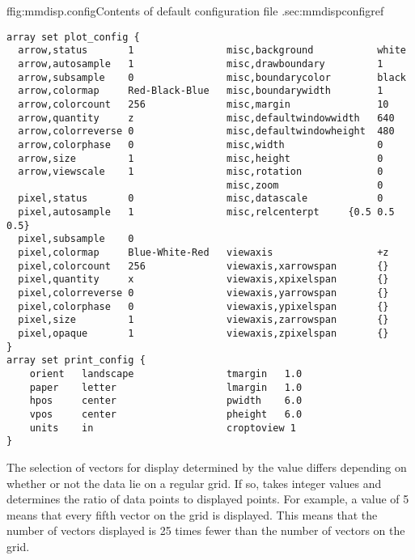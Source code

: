 \begin{codelisting}{f}{fig:mmdisp.config}{Contents of default configuration
  file .}{sec:mmdispconfig}{ref}
\begin{verbatim}
array set plot_config {
  arrow,status       1                misc,background           white
  arrow,autosample   1                misc,drawboundary         1
  arrow,subsample    0                misc,boundarycolor        black
  arrow,colormap     Red-Black-Blue   misc,boundarywidth        1
  arrow,colorcount   256              misc,margin               10
  arrow,quantity     z                misc,defaultwindowwidth   640
  arrow,colorreverse 0                misc,defaultwindowheight  480
  arrow,colorphase   0                misc,width                0
  arrow,size         1                misc,height               0
  arrow,viewscale    1                misc,rotation             0
                                      misc,zoom                 0
  pixel,status       0                misc,datascale            0
  pixel,autosample   1                misc,relcenterpt     {0.5 0.5 0.5}
  pixel,subsample    0
  pixel,colormap     Blue-White-Red   viewaxis                  +z
  pixel,colorcount   256              viewaxis,xarrowspan       {}
  pixel,quantity     x                viewaxis,xpixelspan       {}
  pixel,colorreverse 0                viewaxis,yarrowspan       {}
  pixel,colorphase   0                viewaxis,ypixelspan       {}
  pixel,size         1                viewaxis,zarrowspan       {}
  pixel,opaque       1                viewaxis,zpixelspan       {}
}
array set print_config {
    orient   landscape                tmargin   1.0
    paper    letter                   lmargin   1.0
    hpos     center                   pwidth    6.0
    vpos     center                   pheight   6.0
    units    in                       croptoview 1
}
\end{verbatim}
\end{codelisting}


The selection of vectors for display determined by the
 value differs depending on whether or not the data
lie on a regular grid.  If so,  takes integer
values and determines the ratio of data points to displayed points.  For
example, a value of 5 means that every fifth vector on the grid is
displayed.  This means that the number of vectors displayed is 25 times
fewer than the number of vectors on the grid.

